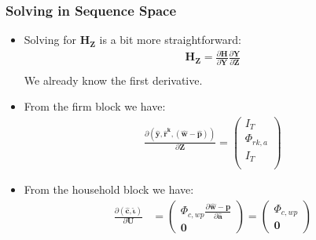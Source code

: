 \documentclass[english,xcolor=svgnames]{beamer}
\begin{document}
\begin{frame}
    \frametitle{Solving in Sequence Space}
		\begin{itemize}
			\item Solving for $\mathbf{H}_{\mathbf{Z}}$ is a bit more straightforward:
			\begin{align*}
				\mathbf{H}_{\mathbf{Z}} = \frac{\partial \mathbf{H}}{\partial \mathbf{Y}}\frac{\partial \mathbf{Y}}{\partial \mathbf{Z}} \\
			\end{align*}
			We already know the first derivative.
			\item From the firm block we have:
			\begin{align*}
				\frac{\partial (\mathbf{\hat{y}},\mathbf{\hat{r}^k},\mathbf{(\hat{w}-\hat{p})})}{\partial \mathbf{Z}} = \begin{pmatrix}
					I_T  \\
					\Phi_{rk,a}  \\
					I_T  \\
				\end{pmatrix}
			\end{align*}
			\item From the household block we have:
			\begin{align*}
				\frac{\partial (\mathbf{\hat{c}},\mathbf{\hat{\iota}})}{\partial \mathbf{U}} &= \begin{pmatrix}
					\Phi_{c,wp}\frac{\partial\mathbf{\hat{w}-\hat{p}}}{\partial \mathbf{\hat{a}} } \\ \mathbf{0} 
				\end{pmatrix} = \begin{pmatrix}
					\Phi_{c,wp} \\ \mathbf{0} 
				\end{pmatrix}
			\end{align*}
		\end{itemize}
\end{frame}
\end{document}
